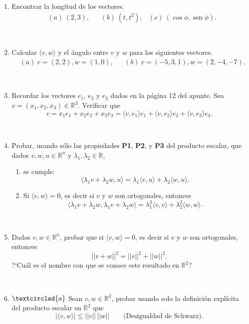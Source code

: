 \documentclass[a4paper,12pt,twoside,spanish,reqno]{amsbook}
\numberwithin{equation}{section}
\begin{document}
\begin{enumerate}
\



\
\item Encontrar la longitud de los vectores.
\begin{align*}
&(a) \ (2,3), && (b) \ (t,t^2), & (c) \ (\cos\phi,\operatorname{sen}\phi).
\end{align*}

\

\item Calcular $\langle v , w  \rangle$ y el {\'a}ngulo entre $v$ y $w$  para los siguientes vectores.
\begin{align*}
&(a) \ v=(2,2), w=(1,0), &&  (b) \  v=(-5,3,1), w=(2,-4,-7).
\end{align*}

\

\item Recordar los vectores $e_1$, $e_2$ y $e_3$ dados en la p\'agina 12 del apunte. Sea $v=(x_1,x_2,x_3)\in\mathbb{R}^3$.  Verificar que
$$v=x_1e_1+x_2e_2+x_3e_3=\langle v,e_1\rangle e_1+\langle v,e_2\rangle e_2+\langle v,e_3\rangle e_3.$$

\

\item Probar, usando s\'olo las propiedades \textbf{P1}, \textbf{P2}, y \textbf{P3} del producto escalar, que dados $v, w, u \in \mathbb R^n$ y $\lambda_1, \lambda_2 \in \mathbb R$,
\begin{enumerate}
	\item se cumple:
	\begin{equation*}
	\langle \lambda_1 v + \lambda_2 w , u  \rangle =  \lambda_1\langle v , u  \rangle +   \lambda_2\langle w , u  \rangle.
	\end{equation*}
	\item Si $\langle v , w  \rangle =0$, es decir si $v$ y $w$ son ortogonales,  entonces
	\begin{equation*}
		\langle \lambda_1 v + \lambda_2 w ,  \lambda_1 v + \lambda_2 w   \rangle =
		\lambda_1^2 \langle  v ,  v  \rangle + \lambda_2^2 \langle w,w  \rangle.
	\end{equation*}
\end{enumerate}


\


\item Dados $v, w\in \mathbb R^n$, probar que si  $\langle v , w  \rangle =0$, es decir si $v$ y $w$ son ortogonales,  entonces
	\begin{equation*}
	||v + w||^2 = ||v||^2 + ||w||^2.
	\end{equation*}
	?`Cu\'al es el nombre con que se conoce este resultado en $\mathbb R^2$?
	

\

\item\label{Schwarz} $\textcircled{a}$ Sean $v,w\in \mathbb R^2$, probar usando  solo la definici\'on explícita del producto escalar en $\mathbb R^2$ que
\begin{equation*}
	|\langle v , w  \rangle| \le ||v||\,||w|| \qquad \text{(Desigualdad de Schwarz).}
\end{equation*}

\end{enumerate}
\end{document}
